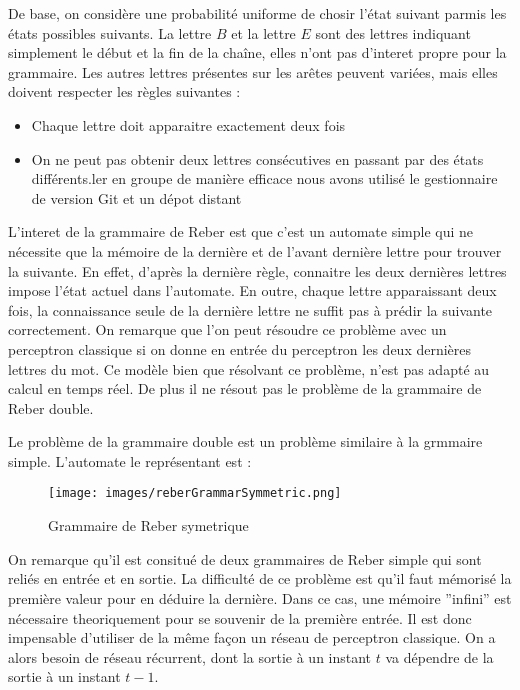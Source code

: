 De base, on considère une probabilité uniforme de chosir l'état suivant parmis
les états possibles suivants. La lettre $B$ et la lettre $E$ sont des lettres
indiquant simplement le début et la fin de la chaîne, elles n'ont pas d'interet
propre pour la grammaire. Les autres lettres présentes sur les arêtes peuvent
variées, mais elles doivent respecter les règles suivantes :
\medskip
\begin{itemize}
	\item Chaque lettre doit apparaitre exactement deux fois
	\item On ne peut pas obtenir deux lettres consécutives en passant par des
états différents.ler en groupe de manière efficace nous avons utilisé le
gestionnaire de version Git et un dépot distant
\end{itemize}
\vspace{\parskip}
L'interet de la grammaire de Reber est que c'est un automate simple qui ne
nécessite que la mémoire de la dernière et de l'avant dernière lettre pour
trouver la suivante. En effet, d'après la dernière règle, connaitre les deux
dernières lettres impose l'état actuel dans l'automate. En outre, chaque lettre
apparaissant deux fois, la connaissance seule de la dernière lettre ne suffit
pas à prédir la suivante correctement. On remarque que l'on peut résoudre ce
problème avec un perceptron classique si on donne en entrée du perceptron les
deux dernières lettres du mot. Ce modèle bien que résolvant ce problème, n'est
pas adapté au calcul en temps réel. De plus il ne résout pas le problème de la
grammaire de Reber double.

Le problème de la grammaire double est un problème similaire à la grmmaire
simple. L'automate le représentant est :

\begin{figure}[!ht]
\begin{center}
\texttt{[image: images/reberGrammarSymmetric.png]}
\end{center}
\caption{Grammaire de Reber symetrique}
\end{figure}

On remarque qu'il est consitué de deux grammaires de Reber simple qui sont
reliés en entrée et en sortie. La difficulté de ce problème est qu'il faut
mémorisé la première valeur pour en déduire la dernière. Dans ce cas, une
mémoire ''infini'' est nécessaire theoriquement pour se souvenir de la première
entrée. Il est donc impensable d'utiliser de la même façon un réseau de
perceptron classique. On a alors besoin de réseau récurrent, dont la sortie à un
 instant $t$ va dépendre de la sortie à un instant $t-1$.

